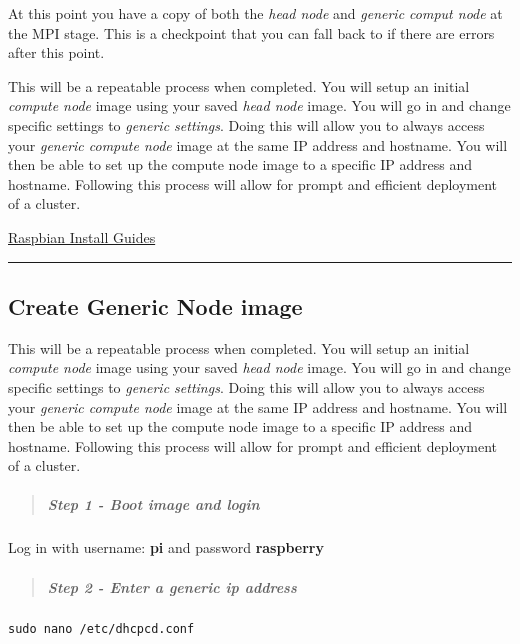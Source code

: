 \documentclass[]{article}
\let\oldsubparagraph\subparagraph
\renewcommand{\subparagraph}[1]{\oldsubparagraph{#1}\mbox{}}
\begin{document}
At this point you have a copy of both the \emph{head node} and
\emph{generic comput node} at the MPI stage. This is a checkpoint that
you can fall back to if there are errors after this point.

This will be a repeatable process when completed. You will setup an
initial \emph{compute node} image using your saved \emph{head node}
image. You will go in and change specific settings to \emph{generic
settings}. Doing this will allow you to always access your \emph{generic
compute node} image at the same IP address and hostname. You will then
be able to set up the compute node image to a specific IP address and
hostname. Following this process will allow for prompt and efficient
deployment of a cluster.

\href{https://www.raspberrypi.org/documentation/installation/installing-images/}{Raspbian
Install Guides}

\begin{center}\rule{0.5\linewidth}{\linethickness}\end{center}

\subsection{Create Generic Node image}\label{create-generic-node-image}

This will be a repeatable process when completed. You will setup an
initial \emph{compute node} image using your saved \emph{head node}
image. You will go in and change specific settings to \emph{generic
settings}. Doing this will allow you to always access your \emph{generic
compute node} image at the same IP address and hostname. You will then
be able to set up the compute node image to a specific IP address and
hostname. Following this process will allow for prompt and efficient
deployment of a cluster.

\begin{quote}
\mbox{}%
\subparagraph{Step 1 - Boot image and
login}\label{step-1---boot-image-and-login}
\end{quote}

Log in with username: \textbf{pi} and password \textbf{raspberry}

\begin{quote}
\mbox{}%
\subparagraph{Step 2 - Enter a generic ip
address}\label{step-2---enter-a-generic-ip-address}
\end{quote}

\texttt{sudo\ nano\ /etc/dhcpcd.conf}
\end{document}
